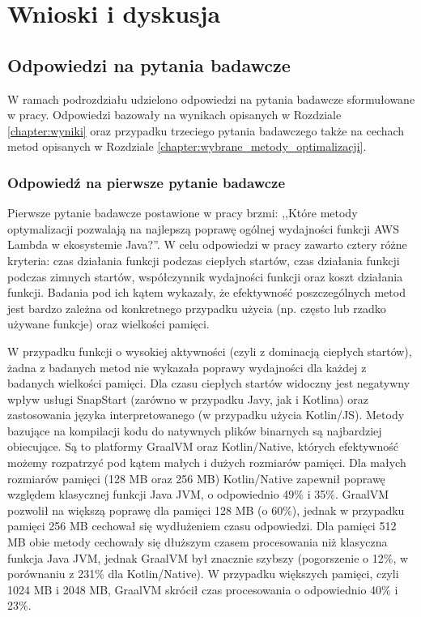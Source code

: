 \chapter{Wnioski i dyskusja}\label{chapter:wnioski_dyskusja}


\section{Odpowiedzi na pytania badawcze}\label{chapter:odpowiedzi_na_pytania_badawcze}

W ramach podrozdziału udzielono odpowiedzi na pytania badawcze sformułowane w pracy. 
Odpowiedzi bazowały na wynikach opisanych w Rozdziale \ref{chapter:wyniki} oraz przypadku trzeciego pytania badawczego także na cechach metod opisanych w Rozdziale \ref{chapter:wybrane_metody_optimalizacji}.

\subsection*{Odpowiedź na pierwsze pytanie badawcze}

Pierwsze pytanie badawcze postawione w pracy brzmi: ,,Które metody optymalizacji pozwalają na najlepszą poprawę ogólnej wydajności funkcji AWS Lambda w ekosystemie Java?''.
W celu odpowiedzi w pracy zawarto cztery różne kryteria: czas działania funkcji podczas ciepłych startów, czas działania funkcji podczas zimnych startów, współczynnik wydajności funkcji oraz koszt działania funkcji.
Badania pod ich kątem wykazały, że efektywność poszczególnych metod jest bardzo zależna od konkretnego przypadku użycia (np. często lub rzadko używane funkcje) oraz wielkości pamięci.

W przypadku funkcji o wysokiej aktywności (czyli z dominacją ciepłych startów), żadna z badanych metod nie wykazała poprawy wydajności dla każdej z badanych wielkości pamięci.
Dla czasu ciepłych startów widoczny jest negatywny wpływ usługi SnapStart (zarówno w przypadku Javy, jak i Kotlina) oraz zastosowania języka interpretowanego (w przypadku użycia Kotlin/JS).
Metody bazujące na kompilacji kodu do natywnych plików binarnych są najbardziej obiecujące.
Są to platformy GraalVM oraz Kotlin/Native, których efektywność możemy rozpatrzyć pod kątem małych i dużych rozmiarów pamięci.
Dla małych rozmiarów pamięci (128 MB oraz 256 MB) Kotlin/Native zapewnił poprawę względem klasycznej funkcji Java JVM, o odpowiednio 49\% i 35\%.
GraalVM pozwolił na większą poprawę dla pamięci 128 MB (o 60\%), jednak w przypadku pamięci 256 MB cechował się wydłużeniem czasu odpowiedzi.
Dla pamięci 512 MB obie metody cechowały się dłuższym czasem procesowania niż klasyczna funkcja Java JVM, jednak GraalVM był znacznie szybszy (pogorszenie o 12\%, w porównaniu z 231\% dla Kotlin/Native).
W przypadku większych pamięci, czyli 1024 MB i 2048 MB, GraalVM skrócił czas procesowania o odpowiednio 40\% i 23\%.

